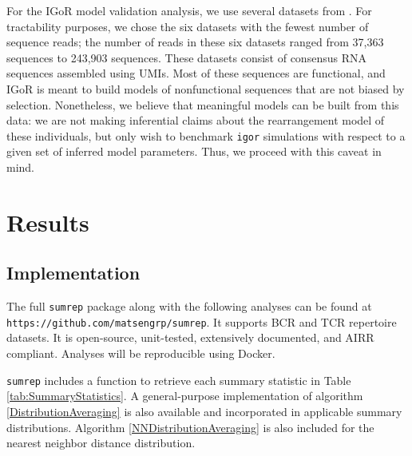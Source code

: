 \documentclass{article}
\begin{document}
For the IGoR model validation analysis, we use several datasets from \cite{Britanova2016-iw}.
For tractability purposes, we chose the six datasets with the fewest number of sequence reads; the number of reads in these six datasets ranged from 37,363 sequences to 243,903 sequences.
These datasets consist of consensus RNA sequences assembled using UMIs.
Most of these sequences are functional, and IGoR is meant to build models of nonfunctional sequences that are not biased by selection.
Nonetheless, we believe that meaningful models can be built from this data: we are not making inferential claims about the rearrangement model of these individuals, but only wish to benchmark \texttt{igor} simulations with respect to a given set of inferred model parameters.
Thus, we proceed with this caveat in mind.

\section*{Results}

\subsection*{Implementation}
The full \texttt{sumrep} package along with the following analyses can be found at \texttt{https://github.com/matsengrp/sumrep}.
It supports BCR and TCR repertoire datasets.
It is open-source, unit-tested, extensively documented, and AIRR compliant.
Analyses will be reproducible using Docker.

\texttt{sumrep} includes a function to retrieve each summary statistic in Table \ref{tab:SummaryStatistics}.
A general-purpose implementation of algorithm \ref{DistributionAveraging} is also available and incorporated in applicable summary distributions.
Algorithm \ref{NNDistributionAveraging} is also included for the nearest neighbor distance distribution.
\end{document}
